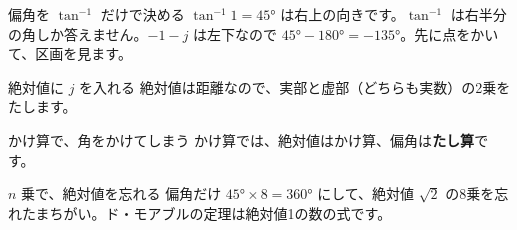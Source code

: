 \noindent\begin{minipage}[t]{0.485\linewidth}\vspace{0pt}
\begin{tsumazuki}{偏角を $\tan^{-1}$ だけで決める}
$\tan^{-1}1=45°$ は右上の向きです。$\tan^{-1}$ は右半分の角しか答えません。$-1-j$ は左下なので $45°-180°=-135°$。先に点をかいて、区画を見ます。
\end{tsumazuki}
\end{minipage}\hfill
\begin{minipage}[t]{0.485\linewidth}\vspace{0pt}
\begin{tsumazuki}{絶対値に $j$ を入れる}
絶対値は距離なので、実部と虚部（どちらも実数）の2乗をたします。
\end{tsumazuki}
\end{minipage}
\par\vspace{2pt}
\noindent\begin{minipage}[t]{0.485\linewidth}\vspace{0pt}
\begin{tsumazuki}{かけ算で、角をかけてしまう}
かけ算では、絶対値はかけ算、偏角は\textbf{たし算}です。
\end{tsumazuki}
\end{minipage}\hfill
\begin{minipage}[t]{0.485\linewidth}\vspace{0pt}
\begin{tsumazuki}{$n$ 乗で、絶対値を忘れる}
偏角だけ $45°\times8=360°$ にして、絶対値 $\sqrt2$ の8乗を忘れたまちがい。ド・モアブルの定理は絶対値1の数の式です。
\end{tsumazuki}
\end{minipage}

